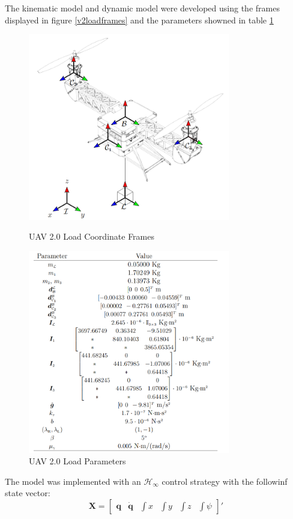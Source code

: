 The kinematic model and dynamic model were developed using the frames displayed in figure \ref{v2loadframes} and the parameters showned in table \ref{v2tab}

\begin{figure} [!ht]
	\centering
	\begin{minipage}{.5\textwidth}
		\centering
		\includegraphics[width=250pt]{figuras/v2loadframes}
		\caption{UAV 2.0 Load Coordinate Frames}
		\label{v2loadframes}
	\end{minipage}%
	\begin{minipage}{.5\textwidth}
		\centering
		\includegraphics[width=250pt]{figuras/v2loadtab}
		\caption{UAV 2.0 Load Parameters}
		\label{v2tab}
	\end{minipage}
\end{figure}

The model was implemented with an $\mathcal{H}_\infty$ control strategy with the followinf state vector:
\begin{equation*}
\bm{X} = \begin{bmatrix}
\bm{q} & \bm{\dot{q}} & \int{x} & \int{y} & \int{z} & \int{\psi}
\end{bmatrix}'
\end{equation*} 

